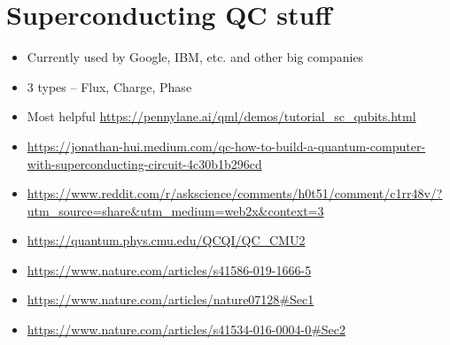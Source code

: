 \section{Superconducting QC stuff}

\begin{itemize}
    \item Currently used by Google, IBM, etc. and other big companies
    \item 3 types – Flux, Charge, Phase
    \item Most helpful \url{https://pennylane.ai/qml/demos/tutorial_sc_qubits.html}
    \item 
    \url{https://jonathan-hui.medium.com/qc-how-to-build-a-quantum-computer-with-superconducting-circuit-4c30b1b296cd}
    \item 
    \url{https://www.reddit.com/r/askscience/comments/h0t51/comment/c1rr48v/?utm_source=share&utm_medium=web2x&context=3}
    \item \url{https://quantum.phys.cmu.edu/QCQI/QC_CMU2}
    \item \url{https://www.nature.com/articles/s41586-019-1666-5}
    \item \url{https://www.nature.com/articles/nature07128#Sec1}
    \item \url{https://www.nature.com/articles/s41534-016-0004-0#Sec2}

\end{itemize}